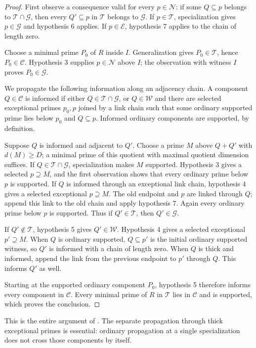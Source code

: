 \begin{proof}
First observe a consequence valid for every $p\in\mathcal N$:
if some $Q\subseteq p$ belongs to $\mathcal T\cap\mathcal G$,
then every $Q'\subseteq p$ in $\mathcal T$ belongs to $\mathcal G$.
If $p\in\mathcal T$, specialization gives $p\in\mathcal G$ and
hypothesis 6 applies. If $p\in\mathcal E$, hypothesis 7 applies to
the chain of length zero.

Choose a minimal prime $P_0$ of $R$ inside $I$.
Generalization gives $P_0\in\mathcal T$, hence $P_0\in\mathcal C$.
Hypothesis 3 supplies $p\in\mathcal N$ above $I$; the observation
with witness $I$ proves $P_0\in\mathcal G$.

We propagate the following information along an adjacency chain.
A component $Q\in\mathcal C$ is informed if either
$Q\in\mathcal T\cap\mathcal G$, or $Q\in\mathcal W$ and there are
selected exceptional primes $p_0,p$ joined by a link chain such that
some ordinary supported prime lies below $p_0$ and $Q\subseteq p$.
Informed ordinary components are supported, by definition.

Suppose $Q$ is informed and adjacent to $Q'$.
Choose a prime $M$ above $Q+Q'$ with $d(M)\ge D$; a minimal prime
of this quotient with maximal quotient dimension suffices.
If $Q\in\mathcal T\cap\mathcal G$, specialization makes $M$ supported.
Hypothesis 3 gives a selected $p\supseteq M$, and the first observation
shows that every ordinary prime below $p$ is supported.
If $Q$ is informed through an exceptional link chain, hypothesis 4
gives a selected exceptional $p\supseteq M$.
The old endpoint and $p$ are linked through $Q$; append this link to
the old chain and apply hypothesis 7.
Again every ordinary prime below $p$ is supported.
Thus if $Q'\in\mathcal T$, then $Q'\in\mathcal G$.

If $Q'\notin\mathcal T$, hypothesis 5 gives $Q'\in\mathcal W$.
Hypothesis 4 gives a selected exceptional $p'\supseteq M$.
When $Q$ is ordinary supported, $Q\subseteq p'$ is the initial
ordinary supported witness, so $Q'$ is informed with a chain of
length zero. When $Q$ is thick and informed, append the link from
the previous endpoint to $p'$ through $Q$.
This informs $Q'$ as well.

Starting at the supported ordinary component $P_0$, hypothesis 5
therefore informs every component in $\mathcal C$.
Every minimal prime of $R$ in $\mathcal T$ lies in $\mathcal C$
and is supported, which proves the conclusion.
\end{proof}
This is the entire argument of
\href{https://github.com/ChristianKudeba/alpoge-rh-verification/blob/alpoge-source-7cbf7a0c/src/Development/AutomorphicArithmetic/AutomorphicVarieties/CurveDVRSpecialization/LocProp.lean}
{}.
The separate propagation through thick exceptional primes is essential:
ordinary propagation at a single specialization does not cross those
components by itself.

